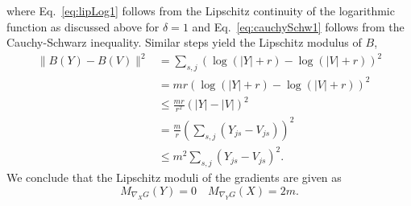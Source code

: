 where Eq.~\eqref{eq:lipLog1} follows from the Lipschitz continuity of the logarithmic function as discussed above for $\delta=1$ and Eq.~\eqref{eq:cauchySchw1} follows from the Cauchy-Schwarz inequality. Similar steps yield the Lipschitz modulus of $B$,
\begin{align}
\lVert B(Y)-B(V)\rVert ^2 &=\sum_{s,j}(\log(\lvert Y\rvert +r)-\log(\lvert V\rvert +r))^2\nonumber\\
&=mr(\log(\lvert Y\rvert +r)-\log(\lvert V\rvert +r))^2\nonumber\\
&\leq \frac{mr}{r^2}(\lvert Y\rvert -\lvert V\rvert )^2\nonumber\\
&= \frac{m}{r}\left(\sum_{s,j}(Y_{j s}-V_{j s})\right)^2\nonumber\\
&\leq m^2\sum_{s,j}(Y_{j s}-V_{j s})^2.\nonumber
\end{align}
We conclude that the Lipschitz moduli of the gradients are given as
\[M_{\nabla_X G}(Y)=0 \quad M_{\nabla_YG}(X)=2m.\]